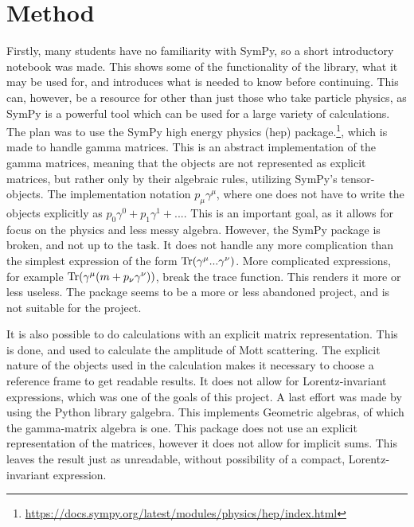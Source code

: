 \documentclass{article}
\begin{document}
    \section*{Method}
    Firstly, many students have no familiarity with SymPy, so a short introductory notebook was made.
    This shows some of the functionality of the library, what it may be used for, and introduces what is needed to know before continuing.
    This can, however, be a resource for other than just those who take particle physics, as SymPy is a powerful tool which can be used for a large variety of calculations.
    The plan was to use the SymPy high energy physics (hep) package.\footnote{\url{https://docs.sympy.org/latest/modules/physics/hep/index.html}}, which is made to handle gamma matrices.
    This is an abstract implementation of the gamma matrices, meaning that the objects are not represented as explicit matrices, but rather only by their algebraic rules, utilizing SymPy’s tensor-objects.
    The implementation notation $p_\mu \gamma^\mu$, where one does not have to write the objects explicitly as $p_0 \gamma^0 + p_1 \gamma^1 +...$.
    This is an important goal, as it allows for focus on the physics and less messy algebra.
    However, the SymPy package is broken, and not up to the task.
    It does not handle any more complication than the simplest expression of the form $\Tr(\gamma^\mu ...
    \gamma^\nu)$.
    More complicated expressions, for example $\Tr(\gamma^\mu (m + p_\nu\gamma^\nu))$, break the trace function.
    This renders it more or less useless.
    The package seems to be a more or less abandoned project, and is not suitable for the project.
       
    It is also possible to do calculations with an explicit matrix representation.
    This is done, and used to calculate the amplitude of Mott scattering.
    The explicit nature of the objects used in the calculation makes it necessary to choose a reference frame to get readable results.
    It does not allow for Lorentz-invariant expressions, which was one of the goals of this project.
    A last effort was made by using the Python library galgebra.
    This implements Geometric algebras, of which the gamma-matrix algebra is one.
    This package does not use an explicit representation of the matrices, however it does not allow for implicit sums.
    This leaves the result just as unreadable, without possibility of a compact, Lorentz-invariant expression.
       
\end{document}
